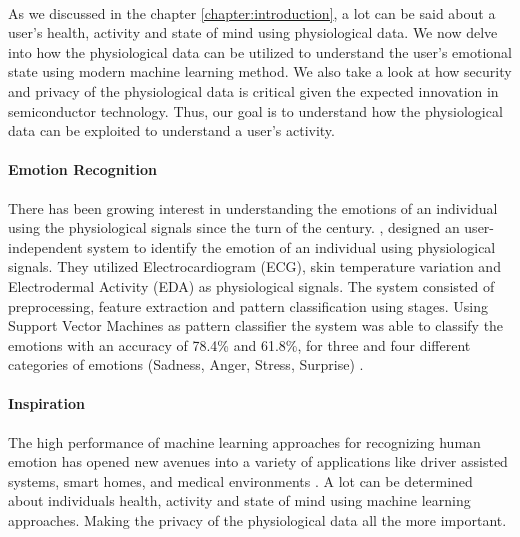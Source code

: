\label{chapter:motivation}
\paragraph{}
As we discussed in the chapter \ref{chapter:introduction}, a lot can be said about a user's health, activity and state of mind using physiological data. We now delve into how the physiological data can be utilized to understand the user's emotional state using modern machine learning method. We also take a look at how security and privacy of the physiological data is critical given the expected innovation in semiconductor technology. Thus, our goal is to understand how the physiological data can be exploited to understand a user's activity.

\paragraph{Emotion Recognition} There has been growing interest in understanding the emotions of an individual using the physiological signals since the turn of the century. \citeauthor{kim_emotion_2004}, designed an user-independent system to identify the emotion of an individual using physiological signals. They utilized Electrocardiogram (ECG), skin temperature variation and Electrodermal Activity (EDA) as physiological signals. The system consisted of preprocessing, feature extraction and pattern classification using stages. Using Support Vector Machines as pattern classifier the system was able to classify the emotions with an accuracy of 78.4\% and 61.8\%, for three and four different categories of emotions (Sadness, Anger, Stress, Surprise) \cite{kim_emotion_2004}.

\paragraph{Inspiration} The high performance of machine learning approaches for recognizing human emotion has opened new avenues into a variety of applications like driver assisted systems, smart homes, and medical environments \cite{ali_globally_2018}. A lot can be determined about individuals health, activity and state of mind using machine learning approaches. Making the privacy of the physiological data all the more important.

